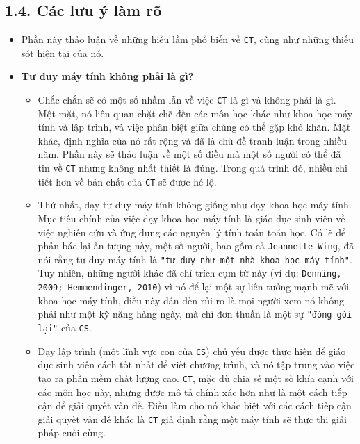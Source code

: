 \subsection*{1.4. Các lưu ý làm rõ}

\begin{itemize}
    \item Phần này thảo luận về những hiểu lầm phổ biến về \texttt{CT}, cũng như những thiếu sót hiện tại của nó.

    \item \textbf{Tư duy máy tính không phải là gì?}
    \begin{itemize}
        \item Chắc chắn sẽ có một số nhầm lẫn về việc \texttt{CT} là gì và không phải là gì. Một mặt, nó liên quan chặt chẽ đến các môn học khác như khoa học máy tính và lập trình, và việc phân biệt giữa chúng có thể gặp khó khăn. Mặt khác, định nghĩa của nó rất rộng và đã là chủ đề tranh luận trong nhiều năm. Phần này sẽ thảo luận về một số điều mà một số người có thể đã tin về \texttt{CT} nhưng không nhất thiết là đúng. Trong quá trình đó, nhiều chi tiết hơn về bản chất của \texttt{CT} sẽ được hé lộ.

        \item Thứ nhất, dạy tư duy máy tính không giống như dạy khoa học máy tính. Mục tiêu chính của việc dạy khoa học máy tính là giáo dục sinh viên về việc nghiên cứu và ứng dụng các nguyên lý tính toán toán học. Có lẽ để phản bác lại ấn tượng này, một số người, bao gồm cả \texttt{Jeannette Wing}, đã nói rằng tư duy máy tính là \verb|"tư duy như một nhà khoa học máy tính"|. Tuy nhiên, những người khác đã chỉ trích cụm từ này (ví dụ: \texttt{Denning, 2009; Hemmendinger, 2010}) vì nó để lại một sự liên tưởng mạnh mẽ với khoa học máy tính, điều này dẫn đến rủi ro là mọi người xem nó không phải như một kỹ năng hàng ngày, mà chỉ đơn thuần là một sự \verb|"đóng gói lại"| của \texttt{CS}.

        \item Dạy lập trình (một lĩnh vực con của \texttt{CS}) chủ yếu được thực hiện để giáo dục sinh viên cách tốt nhất để viết chương trình, và nó tập trung vào việc tạo ra phần mềm chất lượng cao. \texttt{CT}, mặc dù chia sẻ một số khía cạnh với các môn học này, nhưng được mô tả chính xác hơn như là một cách tiếp cận để giải quyết vấn đề. Điều làm cho nó khác biệt với các cách tiếp cận giải quyết vấn đề khác là \texttt{CT} giả định rằng một máy tính sẽ thực thi giải pháp cuối cùng.


\end{itemize}
\end{itemize}
